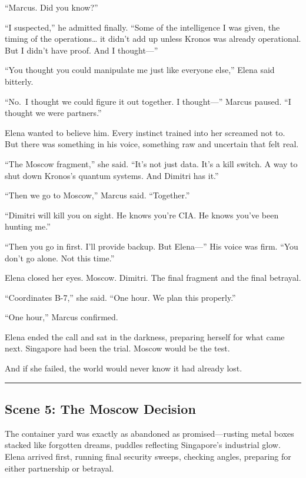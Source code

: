 ``Marcus. Did you know?''

``I suspected,'' he admitted finally. ``Some of the intelligence I was given, the timing of the operations\ldots{} it didn't add up unless Kronos was already operational. But I didn't have proof. And I thought---''

``You thought you could manipulate me just like everyone else,'' Elena said bitterly.

``No.~I thought we could figure it out together. I thought---'' Marcus paused. ``I thought we were partners.''

Elena wanted to believe him. Every instinct trained into her screamed not to. But there was something in his voice, something raw and uncertain that felt real.

``The Moscow fragment,'' she said. ``It's not just data. It's a kill switch. A way to shut down Kronos's quantum systems. And Dimitri has it.''

``Then we go to Moscow,'' Marcus said. ``Together.''

``Dimitri will kill you on sight. He knows you're CIA. He knows you've been hunting me.''

``Then you go in first. I'll provide backup. But Elena---'' His voice was firm. ``You don't go alone. Not this time.''

Elena closed her eyes. Moscow. Dimitri. The final fragment and the final betrayal.

``Coordinates B-7,'' she said. ``One hour. We plan this properly.''

``One hour,'' Marcus confirmed.

Elena ended the call and sat in the darkness, preparing herself for what came next. Singapore had been the trial. Moscow would be the test.

And if she failed, the world would never know it had already lost.

\begin{center}\rule{0.5\linewidth}{0.5pt}\end{center}

\hypertarget{scene-5-the-moscow-decision}{%
\subsection{Scene 5: The Moscow Decision}\label{scene-5-the-moscow-decision}}

The container yard was exactly as abandoned as promised---rusting metal boxes stacked like forgotten dreams, puddles reflecting Singapore's industrial glow. Elena arrived first, running final security sweeps, checking angles, preparing for either partnership or betrayal.

